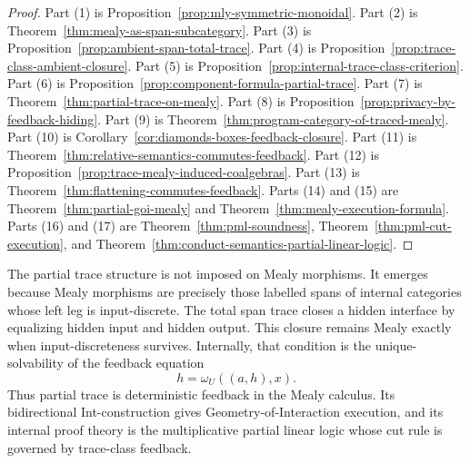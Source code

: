 \begin{proof}
Part (1) is Proposition~\ref{prop:mly-symmetric-monoidal}.  Part (2) is
Theorem~\ref{thm:mealy-as-span-subcategory}.  Part (3) is
Proposition~\ref{prop:ambient-span-total-trace}.  Part (4) is
Proposition~\ref{prop:trace-class-ambient-closure}.  Part (5) is
Proposition~\ref{prop:internal-trace-class-criterion}.  Part (6) is
Proposition~\ref{prop:component-formula-partial-trace}.  Part (7) is
Theorem~\ref{thm:partial-trace-on-mealy}.  Part (8) is
Proposition~\ref{prop:privacy-by-feedback-hiding}.  Part (9) is
Theorem~\ref{thm:program-category-of-traced-mealy}.  Part (10) is
Corollary~\ref{cor:diamonds-boxes-feedback-closure}.  Part (11) is
Theorem~\ref{thm:relative-semantics-commutes-feedback}.  Part (12) is
Proposition~\ref{prop:trace-mealy-induced-coalgebras}.  Part (13) is
Theorem~\ref{thm:flattening-commutes-feedback}.  Parts (14) and (15) are
Theorem~\ref{thm:partial-goi-mealy} and
Theorem~\ref{thm:mealy-execution-formula}.  Parts (16) and (17) are
Theorem~\ref{thm:pml-soundness}, Theorem~\ref{thm:pml-cut-execution}, and
Theorem~\ref{thm:conduct-semantics-partial-linear-logic}.
\end{proof}

\begin{remark}
\label{rem:partial-trace-conceptual-summary}
The partial trace structure is not imposed on Mealy morphisms.  It emerges
because Mealy morphisms are precisely those labelled spans of internal
categories whose left leg is input-discrete.  The total span trace closes a
hidden interface by equalizing hidden input and hidden output.  This closure
remains Mealy exactly when input-discreteness survives.  Internally, that
condition is the unique-solvability of the feedback equation
\[
h=\omega_U((a,h),x).
\]
Thus partial trace is deterministic feedback in the Mealy calculus.  Its
bidirectional Int-construction gives Geometry-of-Interaction execution, and
its internal proof theory is the multiplicative partial linear logic whose cut
rule is governed by trace-class feedback.
\end{remark}